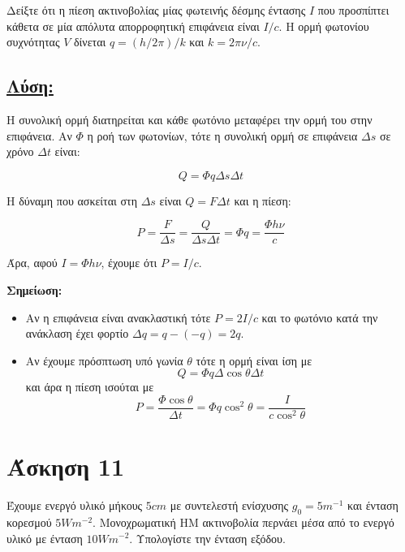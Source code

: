 \documentclass[a4paper,11pt,titlepage]{article}
\begin{document}
Δείξτε ότι η πίεση ακτινοβολίας μίας φωτεινής δέσμης έντασης $I$ που προσπίπτει κάθετα σε μία απόλυτα απορροφητική επιφάνεια είναι $I/c$. Η ορμή φωτονίου συχνότητας $V$ δίνεται $q=(h/2\pi)/k$ και $k=2\pi\nu/c$.

\subsection*{\underline{Λύση:}}

Η συνολική ορμή διατηρείται και κάθε φωτόνιο μεταφέρει την ορμή του στην επιφάνεια. Αν $\Phi$ η ροή των φωτονίων, τότε η συνολική ορμή σε επιφάνεια ${\Delta}s$ σε χρόνο $\Delta t$ είναι:

\begin{equation}
 Q=\Phi q\Delta s\Delta t
\end{equation}

Η δύναμη που ασκείται στη $\Delta s$ είναι $Q=F\Delta t$ και η πίεση:

\begin{equation}
 P=\dfrac{F}{\Delta s}=\dfrac{Q}{\Delta s\Delta t}=\Phi q=\dfrac{\Phi h\nu}{c}
\end{equation}

Άρα, αφού $I=\Phi h\nu$, έχουμε ότι $P=I/c$.

\textbf{Σημείωση:}
\begin{itemize}
 \item Αν η επιφάνεια είναι ανακλαστική τότε $P=2I/c$ και το φωτόνιο κατά την ανάκλαση έχει φορτίο $\Delta q=q-(-q)=2q$.
 \item Αν έχουμε πρόσπτωση υπό γωνία $\theta$ τότε η ορμή είναι ίση με 
\begin{equation}
Q=\Phi q\Delta \cos\theta \Delta t 
\end{equation}
και άρα η πίεση ισούται με
\begin{equation}
 P=\dfrac{\Phi \cos\theta}{\Delta t}=\Phi q\cos^2\theta=\dfrac{I}{c\cos^2\theta}
\end{equation}
\end{itemize}


\section{Άσκηση 11} 

Έχουμε ενεργό υλικό μήκους $5cm$  με συντελεστή ενίσχυσης $g_0=5m^{-1}$ και ένταση κορεσμού $5Wm^{-2}$. Μονοχρωματική ΗΜ ακτινοβολία περνάει μέσα  από το ενεργό υλικό με ένταση $10Wm^{-2}$. Υπολογίστε την ένταση εξόδου.
\end{document}
